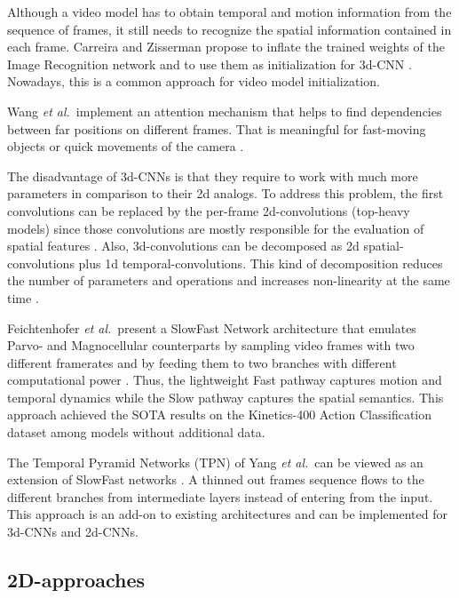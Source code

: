\documentclass[conference]{IEEEtran}
\begin{document}
Although a video model has to obtain temporal and motion information from the sequence of frames, it still needs to recognize the spatial information contained in each frame. Carreira and Zisserman propose to inflate the trained weights of the Image Recognition network and to use them as initialization for 3d-CNN \cite{carreira2017quo}. Nowadays, this is a common approach for video model initialization.

Wang \textit{et al.}~implement an attention mechanism that helps to find dependencies between far positions on different frames. That is meaningful for fast-moving objects or quick movements of the camera \cite{wang2018non}.

The disadvantage of 3d-CNNs is that they require to work with much more parameters in comparison to their 2d analogs. To address this problem, the first convolutions can be replaced by the per-frame 2d-convolutions (top-heavy models) since those convolutions are mostly responsible for the evaluation of spatial features \cite{xie2018rethinking,zolfaghari2018eco}. Also, 3d-convolutions can be decomposed as 2d spatial-convolutions plus 1d temporal-convolutions. This kind of decomposition reduces the number of parameters and operations and increases non-linearity at the same time \cite{xie2018rethinking,tran2018closer}.

Feichtenhofer \textit{et al.}~present a SlowFast Network architecture that emulates Parvo- and Magnocellular counterparts by sampling video frames with two different framerates and by feeding them to two branches with different computational power \cite{feichtenhofer2019slowfast}. Thus, the lightweight Fast pathway captures motion and temporal dynamics while the Slow pathway captures the spatial semantics. This approach achieved the SOTA results on the Kinetics-400 Action Classification dataset \cite{kay2017kinetics} among models without additional data.

The Temporal Pyramid Networks (TPN) of Yang \textit{et al.}~can be viewed as an extension of SlowFast networks \cite{yang2020temporal}. A thinned out frames sequence flows to the different branches from intermediate layers instead of entering from the input. This approach is an add-on to existing architectures and can be implemented for 3d-CNNs and 2d-CNNs.

\subsection{2D-approaches}
\end{document}
